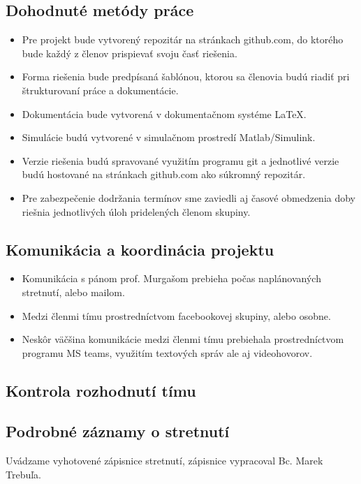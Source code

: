 \documentclass[../main.tex]{subfiles}
\begin{document}
    \subsection{Dohodnuté metódy práce}   
    	\begin{itemize}
    		\item Pre projekt bude vytvorený repozitár na stránkach github.com, do ktorého bude každý z členov prispievať svoju časť riešenia.
    		\item Forma riešenia bude predpísaná šablónou, ktorou sa členovia budú riadiť pri štrukturovaní práce a dokumentácie.
            \item Dokumentácia bude vytvorená v dokumentačnom systéme LaTeX.
            \item Simulácie budú vytvorené v simulačnom prostredí Matlab/Simulink.
            \item Verzie riešenia budú spravované využitím programu git a jednotlivé verzie budú hostované na stránkach github.com ako súkromný repozitár.
            \item Pre zabezpečenie dodržania termínov sme zaviedli aj časové obmedzenia doby riešnia jednotlivých úloh pridelených členom skupiny.
    	\end{itemize}

    \subsection{Komunikácia a koordinácia projektu}
    	\begin{itemize}
    		\item Komunikácia s pánom prof. Murgašom prebieha počas naplánovaných stretnutí, alebo mailom.
    		\item Medzi členmi tímu prostredníctvom facebookovej skupiny, alebo osobne. 
            \item Neskôr väčšina komunikácie medzi členmi tímu prebiehala prostredníctvom programu MS teams, využitím textových správ ale aj videohovorov.
    	\end{itemize}

    \subsection{Kontrola rozhodnutí tímu}
    
    \subsection{Podrobné záznamy o stretnutí}
    Uvádzame vyhotovené zápisnice stretnutí, zápisnice vypracoval Bc. Marek Trebuľa.

    
    
    
    
    
    
    
    
    
\end{document}
